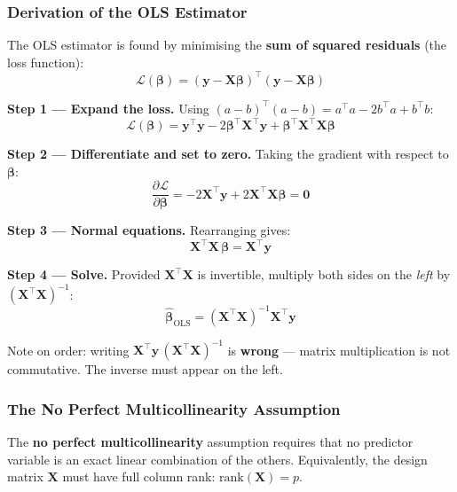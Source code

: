 \subsubsection*{Derivation of the OLS Estimator}

The OLS estimator is found by minimising the \textbf{sum of squared residuals} (the loss function):
\[
\mathcal{L}(\boldsymbol{\beta}) = (\mathbf{y} - \mathbf{X}\boldsymbol{\beta})^\top(\mathbf{y} - \mathbf{X}\boldsymbol{\beta})
\]

\textbf{Step 1 — Expand the loss.} Using $(a-b)^\top(a-b) = a^\top a - 2b^\top a + b^\top b$:
\[
\mathcal{L}(\boldsymbol{\beta}) = \mathbf{y}^\top\mathbf{y} - 2\boldsymbol{\beta}^\top\mathbf{X}^\top\mathbf{y} + \boldsymbol{\beta}^\top\mathbf{X}^\top\mathbf{X}\boldsymbol{\beta}
\]

\textbf{Step 2 — Differentiate and set to zero.} Taking the gradient with respect to $\boldsymbol{\beta}$:
\[
\frac{\partial \mathcal{L}}{\partial \boldsymbol{\beta}} = -2\mathbf{X}^\top\mathbf{y} + 2\mathbf{X}^\top\mathbf{X}\boldsymbol{\beta} = \mathbf{0}
\]

\textbf{Step 3 — Normal equations.} Rearranging gives:
\[
\mathbf{X}^\top\mathbf{X}\,\boldsymbol{\beta} = \mathbf{X}^\top\mathbf{y}
\]

\textbf{Step 4 — Solve.} Provided $\mathbf{X}^\top\mathbf{X}$ is invertible, multiply both sides on the \emph{left} by $(\mathbf{X}^\top\mathbf{X})^{-1}$:
\[
\hat{\boldsymbol{\beta}}_{\mathrm{OLS}} = (\mathbf{X}^\top\mathbf{X})^{-1}\mathbf{X}^\top\mathbf{y}
\]

\begin{remark}
Note on order: writing $\mathbf{X}^\top\mathbf{y}\,(\mathbf{X}^\top\mathbf{X})^{-1}$ is \textbf{wrong} — matrix multiplication is not commutative. The inverse must appear on the left.
\end{remark}

\subsubsection*{The No Perfect Multicollinearity Assumption}

\begin{definition}
The \textbf{no perfect multicollinearity} assumption requires that no predictor variable is an exact linear combination of the others. Equivalently, the design matrix $\mathbf{X}$ must have full column rank: $\mathrm{rank}(\mathbf{X}) = p$.
\end{definition}

